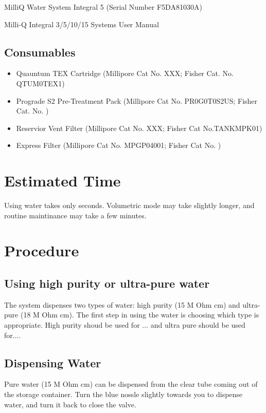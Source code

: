 \documentclass[12pt]{../SOP3_beta}\usepackage[]{graphicx}\usepackage[]{color}
\begin{document}
\NP MilliQ Water System Integral 5 (Serial Number F5DA81030A)

\NP Milli-Q Integral 3/5/10/15 Systems User Manual

\subsection{Consumables}

\begin{itemize}
  \item Quauntum TEX Cartridge (Millipore Cat No. XXX; Fisher Cat. No. QTUM0TEX1)
  \item Prograde S2 Pre-Treatment Pack (Millipore Cat No. PR0G0T0S2US; Fisher Cat. No. ) 
  \item Reservior Vent Filter (Millipore Cat No. XXX; Fisher Cat No.TANKMPK01)
  \item Express Filter (Millipore Cat No. MPGP04001; Fisher Cat No. )
\end{itemize}


\section{Estimated Time}

\NP Using water takes only seconds. Volumetric mode may take slightly longer, and routine maintinance may take a few minutes. 

\section{Procedure}

\subsection{Using high purity or ultra-pure water}

\NP The system dispenses two types of water: high purity (15 M Ohm cm) and ultra-pure (18 M Ohm cm). The first step in using the water is choosing which type is appropriate. High purity shoud be used for ... and ultra pure should be used for....

\subsection{Dispensing Water}

\NP Pure water (15 M Ohm cm) can be dispensed from the clear tube coming out of the storage container. Turn the blue nossle slightly towards you to dispense water, and turn it back to close the valve. 
\end{document}
